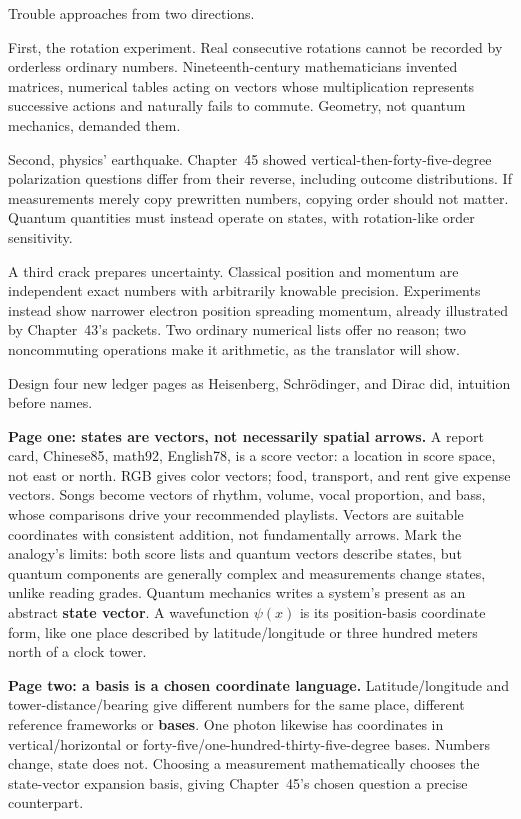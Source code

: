 Trouble approaches from two directions.

First, the rotation experiment. Real consecutive rotations cannot be recorded by orderless ordinary numbers. Nineteenth-century mathematicians invented matrices, numerical tables acting on vectors whose multiplication represents successive actions and naturally fails to commute. Geometry, not quantum mechanics, demanded them.

Second, physics' earthquake. Chapter~45 showed vertical-then-forty-five-degree polarization questions differ from their reverse, including outcome distributions. If measurements merely copy prewritten numbers, copying order should not matter. Quantum quantities must instead operate on states, with rotation-like order sensitivity.

A third crack prepares uncertainty. Classical position and momentum are independent exact numbers with arbitrarily knowable precision. Experiments instead show narrower electron position spreading momentum, already illustrated by Chapter~43's packets. Two ordinary numerical lists offer no reason; two noncommuting operations make it arithmetic, as the translator will show.


Design four new ledger pages as Heisenberg, Schrödinger, and Dirac did, intuition before names.

\textbf{Page one: states are vectors, not necessarily spatial arrows.} A report card, Chinese85, math92, English78, is a score vector: a location in score space, not east or north. RGB gives color vectors; food, transport, and rent give expense vectors. Songs become vectors of rhythm, volume, vocal proportion, and bass, whose comparisons drive your recommended playlists. Vectors are suitable coordinates with consistent addition, not fundamentally arrows. Mark the analogy's limits: both score lists and quantum vectors describe states, but quantum components are generally complex and measurements change states, unlike reading grades. Quantum mechanics writes a system's present as an abstract \textbf{state vector}. A wavefunction $\psi(x)$ is its position-basis coordinate form, like one place described by latitude/longitude or three hundred meters north of a clock tower.

\textbf{Page two: a basis is a chosen coordinate language.} Latitude/longitude and tower-distance/bearing give different numbers for the same place, different reference frameworks or \textbf{bases}. One photon likewise has coordinates in vertical/horizontal or forty-five/one-hundred-thirty-five-degree bases. Numbers change, state does not. Choosing a measurement mathematically chooses the state-vector expansion basis, giving Chapter~45's chosen question a precise counterpart.

